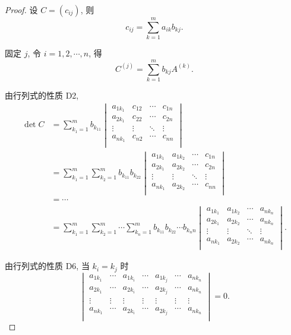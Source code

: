 \documentclass{ctexart}
\begin{document}
\begin{proof}
    设 $C=(c_{ij})$, 则
    \[c_{ij}=\sum_{k=1}^ma_{ik}b_{kj}.\]

    固定 $j$, 令 $i=1,2,\cdots,n$, 得
    \[C^{(j)}=\sum_{k=1}^mb_{kj}A^{(k)}.\]

    由行列式的性质 D2,
    \begin{align*}
        \det C & =\sum_{k_1=1}^mb_{k_11}\begin{vmatrix}
            a_{1k_1} & c_{12} & \cdots & c_{1n} \\
            a_{2k_1} & c_{22} & \cdots & c_{2n} \\
            \vdots & \vdots & \ddots & \vdots \\
            a_{nk_1} & c_{n2} & \cdots & c_{nn} \\
        \end{vmatrix} \\
            & =\sum_{k_1=1}^m\sum_{k_2=1}^mb_{k_11}b_{k_22}\begin{vmatrix}
            a_{1k_1} & a_{1k_2} & \cdots & c_{1n} \\
            a_{2k_1} & a_{2k_2} & \cdots & c_{2n} \\
            \vdots & \vdots & \ddots & \vdots \\
            a_{nk_1} & a_{2k_2} & \cdots & c_{nn} \\
        \end{vmatrix} \\
            & =\cdots \\
            & =\sum_{k_1=1}^m\sum_{k_2=1}^m\cdots\sum_{k_n=1}^mb_{k_11}b_{k_22}\cdots b_{k_nn}\begin{vmatrix}
            a_{1k_1} & a_{1k_2} & \cdots & a_{nk_n} \\
            a_{2k_1} & a_{2k_2} & \cdots & a_{nk_n} \\
            \vdots & \vdots & \ddots & \vdots \\
            a_{nk_1} & a_{2k_2} & \cdots & a_{nk_n} \\
        \end{vmatrix}.
    \end{align*}

    由行列式的性质 D6, 当 $k_i=k_j$ 时
    \[\begin{vmatrix}
        a_{1k_1} & \cdots & a_{1k_i} & \cdots & a_{1k_j} & \cdots & a_{nk_n} \\
        a_{2k_1} & \cdots & a_{2k_i} & \cdots & a_{2k_j} & \cdots & a_{nk_n} \\
        \vdots  & \vdots   & \vdots & \vdots   & \vdots & \vdots   & \vdots \\
        a_{nk_1} & \cdots & a_{2k_i} & \cdots & a_{2k_j} & \cdots & a_{nk_n} \\
    \end{vmatrix}=0.\]


\end{proof}
\end{document}
